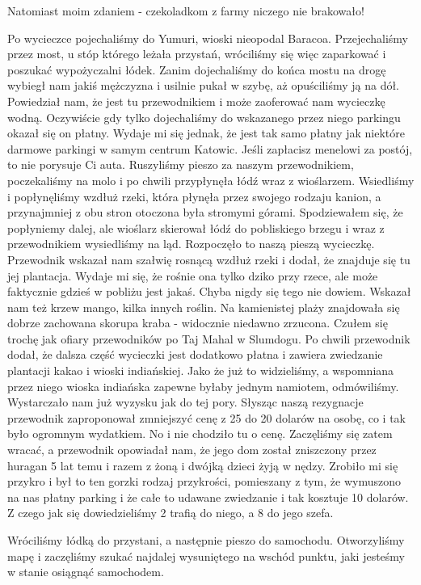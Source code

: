 Natomiast moim zdaniem - czekoladkom z farmy niczego nie brakowało!
\par Po wycieczce pojechaliśmy do Yumuri, wioski nieopodal Baracoa.
Przejechaliśmy przez most, u stóp którego leżała przystań, wróciliśmy się więc zaparkować i poszukać wypożyczalni łódek.
Zanim dojechaliśmy do końca mostu na drogę wybiegł nam jakiś mężczyzna i usilnie pukał w szybę, aż opuściliśmy ją na dół.
Powiedział nam, że jest tu przewodnikiem i może zaoferować nam wycieczkę wodną.
Oczywiście gdy tylko dojechaliśmy do wskazanego przez niego parkingu okazał się on płatny.
Wydaje mi się jednak, że jest tak samo płatny jak niektóre darmowe parkingi w samym centrum Katowic.
Jeśli zapłacisz menelowi za postój, to nie porysuje Ci auta.
Ruszyliśmy pieszo za naszym przewodnikiem, poczekaliśmy na molo i po chwili przypłynęła łódź wraz z wioślarzem.
Wsiedliśmy i popłynęliśmy wzdłuż rzeki, która płynęła przez swojego rodzaju kanion, a przynajmniej z obu stron otoczona była stromymi górami.
Spodziewałem się, że popłyniemy dalej, ale wioślarz skierował łódź do pobliskiego brzegu i wraz z przewodnikiem wysiedliśmy na ląd.
Rozpoczęło to naszą pieszą wycieczkę.
Przewodnik wskazał nam szałwię rosnącą wzdłuż rzeki i dodał, że znajduje się tu jej plantacja.
Wydaje mi się, że rośnie ona tylko dziko przy rzece, ale może faktycznie gdzieś w pobliżu jest jakaś.
Chyba nigdy się tego nie dowiem.
Wskazał nam też krzew mango, kilka innych roślin.
Na kamienistej plaży znajdowała się dobrze zachowana skorupa kraba - widocznie niedawno zrzucona.
Czułem się trochę jak ofiary przewodników po Taj Mahal w Slumdogu.
Po chwili przewodnik dodał, że dalsza część wycieczki jest dodatkowo płatna i zawiera zwiedzanie plantacji kakao i wioski indiańskiej.
Jako że już to widzieliśmy, a wspomniana przez niego wioska indiańska zapewne byłaby jednym namiotem, odmówiliśmy.
Wystarczało nam już wyzysku jak do tej pory.
Słysząc naszą rezygnacje przewodnik zaproponował zmniejszyć cenę z 25 do 20 dolarów na osobę, co i tak było ogromnym wydatkiem.
No i nie chodziło tu o cenę.
Zaczęliśmy się zatem wracać, a przewodnik opowiadał nam, że jego dom został zniszczony przez huragan 5 lat temu i razem z żoną i dwójką dzieci żyją w nędzy.
Zrobiło mi się przykro i był to ten gorzki rodzaj przykrości, pomieszany z tym, że wymuszono na nas płatny parking i że całe to udawane zwiedzanie i tak kosztuje 10 dolarów.
Z czego jak się dowiedzieliśmy 2 trafią do niego, a 8 do jego szefa.
\par Wróciliśmy łódką do przystani, a następnie pieszo do samochodu.
Otworzyliśmy mapę i zaczęliśmy szukać najdalej wysuniętego na wschód punktu, jaki jesteśmy w stanie osiągnąć samochodem.
